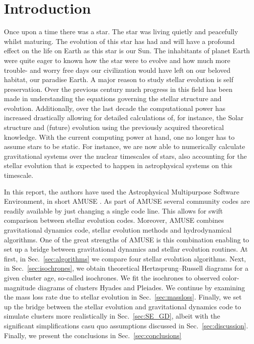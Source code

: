 \documentclass{aa}
\begin{document}

   \maketitle
%

\section{Introduction}
Once upon a time there was a star. The star was living quietly and peacefully whilst maturing. The evolution of this star has had and will have a profound effect on the life on Earth as this star is our Sun. The inhabitants of planet Earth were quite eager to known how the star were to evolve and how much more trouble- and worry free days our civilization would have left on our beloved habitat, our paradise Earth. A major reason to study stellar evolution is self preservation. Over the previous century much progress in this field has been made in understanding the equations governing the stellar structure and evolution. Additionally, over the last decade the computational power has increased drastically allowing for detailed calculations of, for instance, the Solar structure and (future) evolution using the previously acquired theoretical knowledge. With the current computing power at hand, one no longer has to assume stars to be static. For instance, we are now able to numerically calculate gravitational systems over the nuclear timescales of stars, also accounting for the stellar evolution that is expected to happen in astrophysical systems on this timescale.

In this report, the authors have used the Astrophysical Multipurpose Software Environment, in short AMUSE \citep{2009NewA...14..369P, 2013CoPhC.183..456P, 2013A&A...557A..84P}. As part of AMUSE several community codes are readily available by just changing a single code line. This allows for swift comparison between stellar evolution codes. Moreover, AMUSE combines gravitational dynamics code, stellar evolution methods and hydrodynamical algorithms. One of the great strengths of AMUSE is this combination enabling to set up a bridge between gravitational dynamics and stellar evolution routines. At first, in Sec.~\ref{sec:algorithms} we compare four stellar evolution algorithms. Next, in Sec.~\ref{sec:isochrones}, we obtain theoretical Hertzsprung–Russell diagrams for a given cluster age, so-called isochrones. We fit the isochrones to observed color-magnitude diagrams of clusters Hyades and Pleiades. We continue by examining the mass loss rate due to stellar evolution in Sec.~\ref{sec:massloss}. Finally, we set up the bridge between the stellar evolution and gravitational dynamics code to simulate clusters more realistically in Sec.~\ref{sec:SE_GD}, albeit with the significant simplifications casu quo assumptions discussed in Sec.~\ref{sec:discussion}. Finally, we present the conclusions in Sec.~\ref{sec:conclusions}
\end{document}
